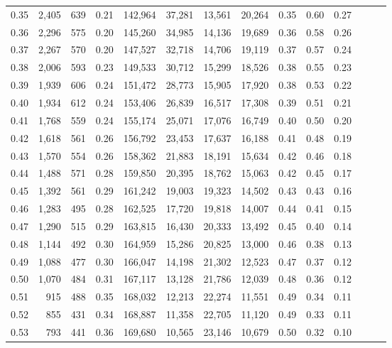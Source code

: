 \begin{tabular}{rrrrrrrrrrrrrr}
0.35 &  2,405 &  639 &  0.21 &  142,964 &   37,281 &  13,561 &  20,264 &  0.35 &  0.60 &      0.27 \\
0.36 &  2,296 &  575 &  0.20 &  145,260 &   34,985 &  14,136 &  19,689 &  0.36 &  0.58 &      0.26 \\
0.37 &  2,267 &  570 &  0.20 &  147,527 &   32,718 &  14,706 &  19,119 &  0.37 &  0.57 &      0.24 \\
0.38 &  2,006 &  593 &  0.23 &  149,533 &   30,712 &  15,299 &  18,526 &  0.38 &  0.55 &      0.23 \\
0.39 &  1,939 &  606 &  0.24 &  151,472 &   28,773 &  15,905 &  17,920 &  0.38 &  0.53 &      0.22 \\
0.40 &  1,934 &  612 &  0.24 &  153,406 &   26,839 &  16,517 &  17,308 &  0.39 &  0.51 &      0.21 \\
0.41 &  1,768 &  559 &  0.24 &  155,174 &   25,071 &  17,076 &  16,749 &  0.40 &  0.50 &      0.20 \\
0.42 &  1,618 &  561 &  0.26 &  156,792 &   23,453 &  17,637 &  16,188 &  0.41 &  0.48 &      0.19 \\
0.43 &  1,570 &  554 &  0.26 &  158,362 &   21,883 &  18,191 &  15,634 &  0.42 &  0.46 &      0.18 \\
0.44 &  1,488 &  571 &  0.28 &  159,850 &   20,395 &  18,762 &  15,063 &  0.42 &  0.45 &      0.17 \\
0.45 &  1,392 &  561 &  0.29 &  161,242 &   19,003 &  19,323 &  14,502 &  0.43 &  0.43 &      0.16 \\
0.46 &  1,283 &  495 &  0.28 &  162,525 &   17,720 &  19,818 &  14,007 &  0.44 &  0.41 &      0.15 \\
0.47 &  1,290 &  515 &  0.29 &  163,815 &   16,430 &  20,333 &  13,492 &  0.45 &  0.40 &      0.14 \\
0.48 &  1,144 &  492 &  0.30 &  164,959 &   15,286 &  20,825 &  13,000 &  0.46 &  0.38 &      0.13 \\
0.49 &  1,088 &  477 &  0.30 &  166,047 &   14,198 &  21,302 &  12,523 &  0.47 &  0.37 &      0.12 \\
0.50 &  1,070 &  484 &  0.31 &  167,117 &   13,128 &  21,786 &  12,039 &  0.48 &  0.36 &      0.12 \\
0.51 &    915 &  488 &  0.35 &  168,032 &   12,213 &  22,274 &  11,551 &  0.49 &  0.34 &      0.11 \\
0.52 &    855 &  431 &  0.34 &  168,887 &   11,358 &  22,705 &  11,120 &  0.49 &  0.33 &      0.11 \\
0.53 &    793 &  441 &  0.36 &  169,680 &   10,565 &  23,146 &  10,679 &  0.50 &  0.32 &      0.10 \\

\end{tabular}
